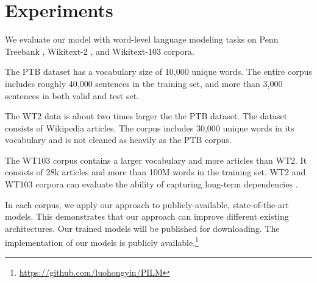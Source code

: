 \documentclass[11pt,a4paper]{article}
\begin{document}
\section{Experiments}



We evaluate our model with word-level language modeling tasks on Penn Treebank  \cite[PTB;][]{mikolov2010recurrent}, Wikitext-2  \cite[WT2;][]{bradbury2016quasi}, and Wikitext-103  \cite[WT103;][]{merity2016pointer} corpora.

The PTB dataset has a vocabulary size of 10,000 unique words. The entire corpus includes roughly 40,000 sentences in the training set, and more than 3,000 sentences in both valid and test set.

The WT2 data is about two times larger the the PTB dataset. The dataset consists of Wikipedia articles. The corpus includes 30,000 unique words in its vocabulary and is not cleaned as heavily as the PTB corpus.

The WT103 corpus contains a larger vocabulary and more articles than WT2. It consists of 28k articles and more than 100M words in the training set. WT2 and WT103 corpora can evaluate the ability of capturing long-term dependencies \cite{dai2018transformer}.



In each corpus, we apply our approach to publicly-available, state-of-the-art models. This demonstrates that our approach can improve different existing architectures. Our trained models will be published for downloading. The implementation of our models is publicly available.\footnote{\url{https://github.com/luohongyin/PILM}}
\end{document}
